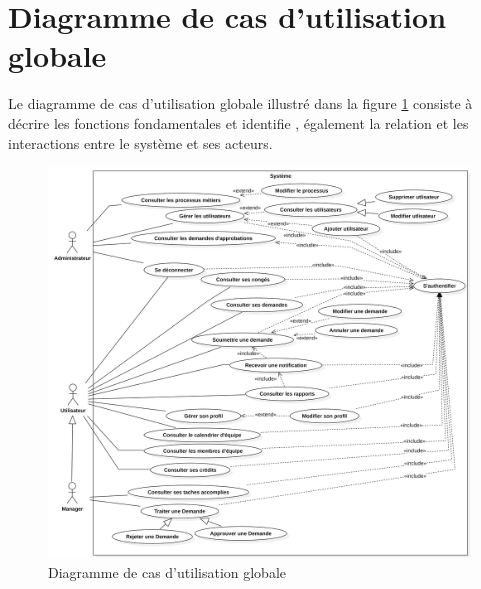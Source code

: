 \section{Diagramme de cas d'utilisation globale}
Le diagramme de cas d'utilisation globale illustré dans la figure \ref{usecaseDiagram} consiste à décrire les fonctions fondamentales et identifie , également la relation et les interactions entre le système et ses acteurs.
\begin{figure}[H]
\begin{adjustwidth}{-2.7cm}{-2cm} %
\centering
\includegraphics[width=20cm]{images/UseCaseDiagram.jpg}
\caption{Diagramme de cas d'utilisation globale}
\label{usecaseDiagram}
\end{adjustwidth}
\end{figure}
\newpage
